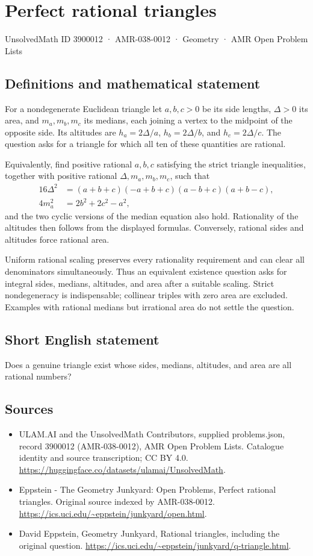 \documentclass[11pt,a4paper]{article}
\begin{document}
\section*{Perfect rational triangles}\label{3900012}
{\small UnsolvedMath ID 3900012 · AMR-038-0012 · Geometry · AMR Open Problem Lists}
\subsection{Definitions and mathematical statement}
For a nondegenerate Euclidean triangle let $a,b,c>0$ be its side lengths,
$\Delta>0$ its area, and $m_a,m_b,m_c$ its medians, each joining a vertex
to the midpoint of the opposite side. Its altitudes are
$h_a=2\Delta/a$, $h_b=2\Delta/b$, and $h_c=2\Delta/c$.
The question asks for a triangle for which all ten of these quantities
are rational.

Equivalently, find positive rational $a,b,c$ satisfying the strict triangle
inequalities, together with positive rational $\Delta,m_a,m_b,m_c$, such that
\[
 \begin{aligned}
 16\Delta^2&=(a+b+c)(-a+b+c)(a-b+c)(a+b-c),\\
 4m_a^2&=2b^2+2c^2-a^2,
 \end{aligned}
\]
and the two cyclic versions of the median equation also hold. Rationality
of the altitudes then follows from the displayed formulas. Conversely,
rational sides and altitudes force rational area.

Uniform rational scaling preserves every rationality requirement and can
clear all denominators simultaneously. Thus an equivalent existence
question asks for integral sides, medians, altitudes, and area after a
suitable scaling. Strict nondegeneracy is indispensable; collinear triples
with zero area are excluded. Examples with rational medians but irrational
area do not settle the question.
\subsection{Short English statement}
Does a genuine triangle exist whose sides, medians, altitudes, and area
are all rational numbers?
\subsection{Sources}
\begin{itemize}
\item[S1] ULAM.AI and the UnsolvedMath Contributors, supplied problems.json, record 3900012 (AMR-038-0012), AMR Open Problem Lists. Catalogue identity and source transcription; CC BY 4.0.
\url{https://huggingface.co/datasets/ulamai/UnsolvedMath}.
\item[S2] Eppstein - The Geometry Junkyard: Open Problems, Perfect rational triangles. Original source indexed by AMR-038-0012.
\url{https://ics.uci.edu/~eppstein/junkyard/open.html}.
\item[S3] David Eppstein, Geometry Junkyard, Rational triangles, including the original question.
\url{https://ics.uci.edu/~eppstein/junkyard/q-triangle.html}.
\end{itemize}
\end{document}
